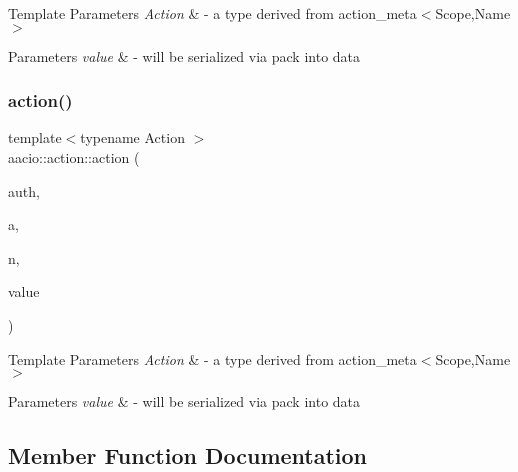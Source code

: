 \begin{DoxyTemplParams}{Template Parameters}
{\em Action} & -\/ a type derived from action\+\_\+meta$<$\+Scope,\+Name$>$ \\
\hline
\end{DoxyTemplParams}

\begin{DoxyParams}{Parameters}
{\em value} & -\/ will be serialized via pack into data \\
\hline
\end{DoxyParams}
\mbox{\label{structaacio_1_1action_ad4d3cd6efc862563256323ae622d01fe}} 
\subsubsection{\texorpdfstring{action()}{action()}\hspace{0.1cm}{\footnotesize\ttfamily [4/4]}}
{\footnotesize\ttfamily template$<$typename Action $>$ \\
aacio\+::action\+::action (\begin{DoxyParamCaption}\item[{const \mbox{\hyperlink{structaacio_1_1permission__level}{permission\+\_\+level}} \&}]{auth,  }\item[{\mbox{\hyperlink{structaacio_1_1chain_1_1name}{account\+\_\+name}}}]{a,  }\item[{action\+\_\+name}]{n,  }\item[{const Action \&}]{value }\end{DoxyParamCaption})\hspace{0.3cm}{\ttfamily [inline]}}


\begin{DoxyTemplParams}{Template Parameters}
{\em Action} & -\/ a type derived from action\+\_\+meta$<$\+Scope,\+Name$>$ \\
\hline
\end{DoxyTemplParams}

\begin{DoxyParams}{Parameters}
{\em value} & -\/ will be serialized via pack into data \\
\hline
\end{DoxyParams}


\subsection{Member Function Documentation}
\mbox{\label{structaacio_1_1action_a400ffee1d8c1ae4262e601dbf6ec5fc0}} 
